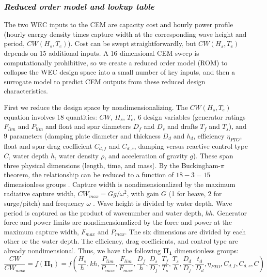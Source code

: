 \documentclass[10pt,twoside]{article}
\begin{document}
\subsubsection{\textit{Reduced order model and lookup table}}
The two WEC inputs to the CEM are capacity cost and hourly power profile (hourly energy density times capture width at the corresponding wave height and period, $CW(H_s,T_e)$).
Cost can be swept straightforwardly, but $CW(H_s,T_e)$ depends on 15 additional inputs. 
A 16-dimensional CEM sweep is computationally prohibitive, so we create a reduced order model (ROM) to collapse the WEC design space into a small number of key inputs, and then a surrogate model to predict CEM outputs from these reduced design characteristics.

First we reduce the design space by nondimensionalizing.
The $CW(H_s,T_e)$ equation involves 18 quantities: $CW$, $H_s$, $T_e$, 
6 design variables (generator ratings $F_{lim}$ and $P_{lim}$ and float and spar diameters $D_f$ and $D_s$ and drafts $T_f$ and $T_s$), 
and 9 parameters (damping plate diameter and thickness $D_d$ and $h_d$, efficiency $\eta_{PTO}$, float and spar drag coefficient $C_{d,f}$ and $C_{d,s}$, damping versus reactive control type $C$, water depth $h$, water density $\rho$, and acceleration of gravity $g$). 
These span three physical dimensions (length, time, and mass).
By the Buckingham-$\pi$ theorem, the relationship can be reduced to a function of $18-3=15$ dimensionless groups \cite{mckinley_buckingham_2021}. 
Capture width is nondimensionalized by the maximum radiative capture width, $CW_{max}=Gg/\omega^2$, with gain $G$ (1 for heave, 2 for surge/pitch) and frequency $\omega$ \cite{zou_practical_2023}. %
Wave height is divided by water depth. %
Wave period is captured as the product of wavenumber and water depth, $kh$. %
Generator force and power limits are nondimensionalized by the force and power at the maximum capture width, $F_{max}$ and $P_{max}$. %
The six dimensions are divided by each other or the water depth.%
The efficiency, drag coefficients, and control type are already nondimensional. %
Thus, we have the following $\mathbf{\Pi_1}$ dimensionless groups:
\begin{equation}
    \frac{CW}{CW_{max}} = f\left( \mathbf{\Pi_1} \right) = f\left(\frac{H_s}{h}, kh, 
    \frac{P_{lim}}{P_{max}}, \frac{F_{lim}}{F_{max}},
    \frac{D_f}{h}, \frac{D_s}{D_f}, \frac{T_f}{T_s}, \frac{T_s}{h}, \frac{D_d}{D_f}, \frac{t_d}{D_d}, 
    \eta_{PTO}, C_{d,f}, C_{d,s},  C\right)
\end{equation}
\end{document}
